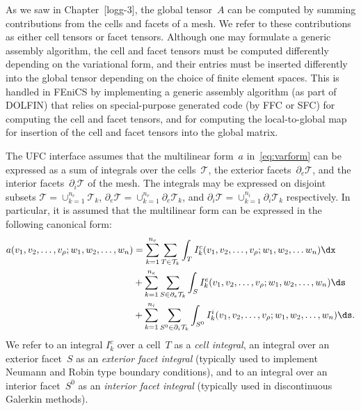 As we saw in Chapter~[logg-3], the global tensor~$A$ can be computed
by summing contributions from the cells and facets of a mesh. We refer
to these contributions as either cell tensors or facet
tensors. Although one may formulate a generic assembly algorithm, the
cell and facet tensors must be computed differently depending on the
variational form, and their entries must be inserted differently into
the global tensor depending on the choice of finite element
spaces. This is handled in FEniCS by implementing a generic assembly
algorithm (as part of DOLFIN) that relies on special-purpose generated
code (by FFC or SFC) for computing the cell and facet tensors, and for
computing the local-to-global map for insertion of the cell and facet
tensors into the global matrix.

The UFC interface assumes that the multilinear form~$a$
in~\eqref{eq:varform} can be expressed as a sum of integrals over the
cells~$\mathcal{T}$, the exterior facets~$\partial_e \mathcal{T}$, and
the interior facets~$\partial_i \mathcal{T}$ of the mesh. The
integrals may be expressed on disjoint subsets $\mathcal{T} =
\cup_{k=1}^{n_c} \mathcal{T}_k$, $\partial_e \mathcal{T} =
\cup_{k=1}^{n_e} \partial_e \mathcal{T}_k$, and $\partial_i
\mathcal{T} = \cup_{k=1}^{n_i} \partial_i \mathcal{T}_k$
respectively. In particular, it is assumed that the multilinear form
can be expressed in the following canonical form:
\begin{equation} \label{eq:form_integrals}
  \begin{split}
    a(v_1, v_2, \ldots, v_{\rho}; w_1, w_2, \ldots,  w_n)
    &=
    \sum_{k=1}^{n_c} \sum_{T\in\mathcal{T}_k} \int_{T}
    I^c_k(v_1, v_2, \ldots, v_{\rho}; w_1, w_2, \ldots w_n) \dx \\
    &+
    \sum_{k=1}^{n_e} \sum_{S\in\partial_e\mathcal{T}_k} \int_{S}
    I^e_k(v_1, v_2, \ldots, v_{\rho}; w_1, w_2, \ldots,  w_n) \ds \\
    &+
    \sum_{k=1}^{n_i} \sum_{S^0\in\partial_i\mathcal{T}_k} \int_{S^0}
    I^i_k(v_1, v_2, \ldots, v_{\rho}; w_1, w_2, \ldots, w_n) \ds.
  \end{split}
\end{equation}
We refer to an integral $I^c_k$ over a cell~$T$ as a \emph{cell
  integral}, an integral over an exterior facet~$S$ as an
\emph{exterior facet integral} (typically used to implement Neumann
and Robin type boundary conditions), and to an integral over an
interior facet~$S^0$ as an \emph{interior facet integral} (typically
used in discontinuous Galerkin methods).

